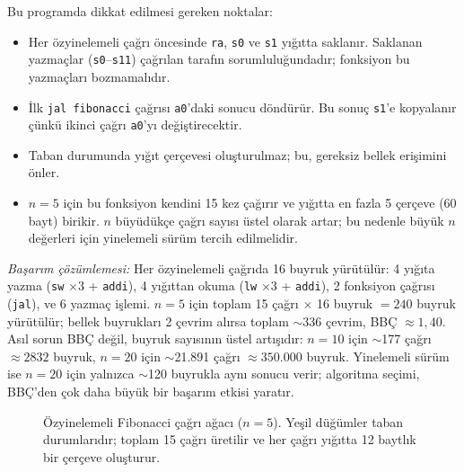 \begin{ornek}[4.14]
Bu programda dikkat edilmesi gereken noktalar:
\begin{itemize}
\item Her özyinelemeli çağrı öncesinde \texttt{ra}, \texttt{s0} ve \texttt{s1} yığıtta saklanır. Saklanan yazmaçlar (\texttt{s0}--\texttt{s11}) çağrılan tarafın sorumluluğundadır; fonksiyon bu yazmaçları bozmamalıdır.
\item İlk \texttt{jal fibonacci} çağrısı \texttt{a0}'daki sonucu döndürür. Bu sonuç \texttt{s1}'e kopyalanır çünkü ikinci çağrı \texttt{a0}'yı değiştirecektir.
\item Taban durumunda yığıt çerçevesi oluşturulmaz; bu, gereksiz bellek erişimini önler.
\item $n = 5$ için bu fonksiyon kendini 15 kez çağırır ve yığıtta en fazla 5 çerçeve (60 bayt) birikir. $n$ büyüdükçe çağrı sayısı üstel olarak artar; bu nedenle büyük $n$ değerleri için yinelemeli sürüm tercih edilmelidir.
\end{itemize}

\emph{Başarım çözümlemesi:} Her özyinelemeli çağrıda 16 buyruk yürütülür: 4 yığıta yazma (\texttt{sw} $\times 3$ + \texttt{addi}), 4 yığıttan okuma (\texttt{lw} $\times 3$ + \texttt{addi}), 2 fonksiyon çağrısı (\texttt{jal}), ve 6 yazmaç işlemi. $n = 5$ için toplam 15 çağrı $\times$ 16 buyruk $= 240$ buyruk yürütülür; bellek buyrukları 2 çevrim alırsa toplam $\sim$336 çevrim, BBÇ $\approx 1{,}40$. Asıl sorun BBÇ değil, buyruk sayısının üstel artışıdır: $n = 10$ için $\sim$177 çağrı $\approx 2832$ buyruk, $n = 20$ için $\sim$21.891 çağrı $\approx 350.000$ buyruk. Yinelemeli sürüm ise $n = 20$ için yalnızca $\sim$120 buyrukla aynı sonucu verir; algoritma seçimi, BBÇ'den çok daha büyük bir başarım etkisi yaratır.
\end{ornek}

\begin{figure}[H]
\centering
{}
\caption[Özyinelemeli Fibonacci çağrı ağacı]{Özyinelemeli Fibonacci çağrı ağacı ($n=5$). Yeşil düğümler taban durumlarıdır; toplam 15 çağrı üretilir ve her çağrı yığıtta 12 baytlık bir çerçeve oluşturur.}
\label{fig:fibonacci-agac}
\end{figure}

